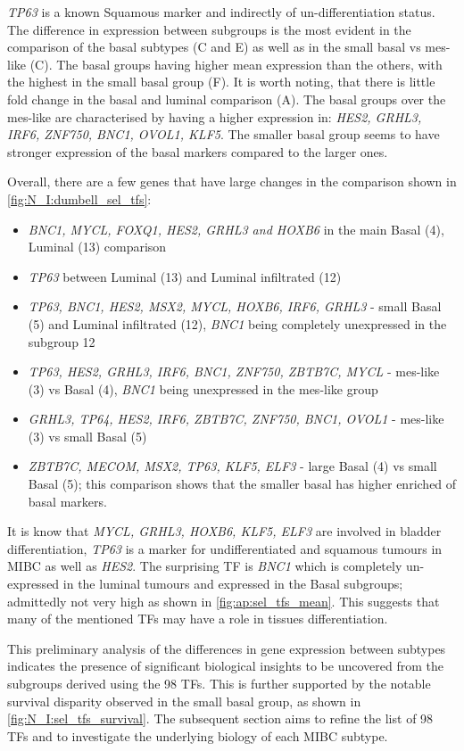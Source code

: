 \textit{TP63} is a known Squamous marker \citet{Robertson2023-na} and indirectly of un-differentiation status. The difference in expression between subgroups is the most evident in the comparison of the basal subtypes (C and E) as well as in the small basal vs mes-like (C). The basal groups having higher mean expression than the others, with the highest in the small basal group (F). It is worth noting, that there is little fold change in the basal and luminal comparison (A). The basal groups over the mes-like are characterised by having a higher expression in: \textit{HES2, GRHL3, IRF6, ZNF750, BNC1, OVOL1, KLF5}. The smaller basal group seems to have stronger expression of the basal markers compared to the larger ones.

Overall, there are a few genes that have large changes in the comparison shown in \cref{fig:N_I:dumbell_sel_tfs}: 
\begin{itemize}
    \item \textit{BNC1, MYCL, FOXQ1, HES2, GRHL3 and HOXB6} in the main Basal (4), Luminal (13) comparison
    \item \textit{TP63} between Luminal (13) and Luminal infiltrated (12)
    \item \textit{TP63, BNC1, HES2, MSX2, MYCL, HOXB6, IRF6, GRHL3} - small Basal (5) and Luminal infiltrated (12), \textit{BNC1} being completely unexpressed in the subgroup 12
    \item \textit{TP63, HES2, GRHL3, IRF6, BNC1, ZNF750, ZBTB7C, MYCL} - mes-like (3) vs Basal (4), \textit{BNC1} being unexpressed in the mes-like group
    \item \textit{GRHL3, TP64, HES2, IRF6, ZBTB7C, ZNF750, BNC1, OVOL1} - mes-like (3) vs small Basal (5) 
    \item \textit{ZBTB7C, MECOM, MSX2, TP63, KLF5, ELF3} - large Basal (4) vs small Basal (5); this comparison shows that the smaller basal has higher enriched of basal markers.
\end{itemize}


It is know that \textit{MYCL, GRHL3, HOXB6, KLF5, ELF3} are involved in bladder differentiation, \textit{TP63} is a marker for undifferentiated and squamous tumours in MIBC as well as \textit{HES2}. The surprising TF is \textit{BNC1} which is completely un-expressed in the luminal tumours and expressed in the Basal subgroups; admittedly not very high as shown in \cref{fig:ap:sel_tfs_mean}. This suggests that many of the mentioned TFs may have a role in tissues differentiation.

This preliminary analysis of the differences in gene expression between subtypes indicates the presence of significant biological insights to be uncovered from the subgroups derived using the 98 TFs. This is further supported by the notable survival disparity observed in the small basal group, as shown in \cref{fig:N_I:sel_tfs_survival}. The subsequent section aims to refine the list of 98 TFs and to investigate the underlying biology of each MIBC subtype.

